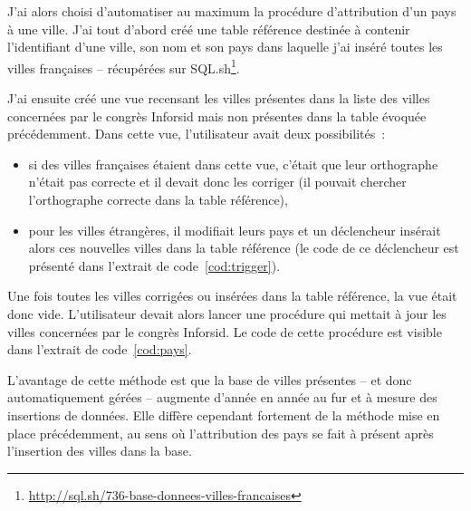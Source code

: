 			J'ai alors choisi d'automatiser au maximum la procédure d'attribution d'un pays à une ville. J'ai tout d'abord créé une table référence destinée à contenir l'identifiant d'une ville, son nom et son pays dans laquelle j'ai inséré toutes les villes françaises -- récupérées sur SQL.sh\footnote{\url{http://sql.sh/736-base-donnees-villes-francaises}}.
			
			J'ai ensuite créé une vue recensant les villes présentes dans la liste des villes concernées par le congrès Inforsid mais non présentes dans la table évoquée précédemment. Dans cette vue, l'utilisateur avait deux possibilités~:
			\begin{itemize}
				\item si des villes françaises étaient dans cette vue, c'était que leur orthographe n'était pas correcte et il devait donc les corriger (il pouvait chercher l'orthographe correcte dans la table référence),
				\item pour les villes étrangères, il modifiait leurs pays et un déclencheur insérait alors ces nouvelles villes dans  la table référence (le code de ce déclencheur est présenté dans l'extrait de code~\ref{cod:trigger}).
			\end{itemize}	
			
			
					
			Une fois toutes les villes corrigées ou insérées dans la table référence, la vue était donc vide. L'utilisateur devait alors lancer une procédure qui mettait à jour les villes concernées par le congrès Inforsid. Le code de cette procédure est visible dans l'extrait de code~\ref{cod:pays}.
			
			
			
			L'avantage de cette méthode est que la base de villes présentes -- et donc automatiquement gérées -- augmente d'année en année au fur et à mesure des insertions de données. Elle diffère cependant fortement de la méthode mise en place précédemment, au sens où l'attribution des pays se fait à présent après l'insertion des villes dans la base.